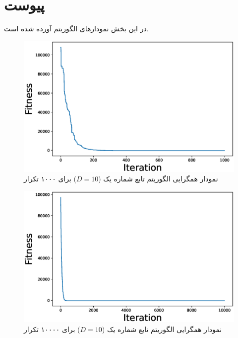 \section{پیوست}\label{sec:appendix}
در این بخش نمودارهای الگوریتم 
آورده شده است.
 \begin{figure}[H]
	\caption{نمودار همگرایی الگوریتم  تابع شماره یک ($D=10$) برای ۱۰۰۰ تکرار } 
	\centering 
	\includegraphics[width=16cm]{../Figure/Q1/PSO_convergence_curve_10_ite_1000} 
\end{figure}

 \begin{figure}[H]
	\caption{نمودار همگرایی الگوریتم  تابع شماره یک ($D=10$) برای ۱۰۰۰۰ تکرار } 
	\centering 
	\includegraphics[width=16cm]{../Figure/Q1/PSO_convergence_curve_10_ite_10000} 
\end{figure}

